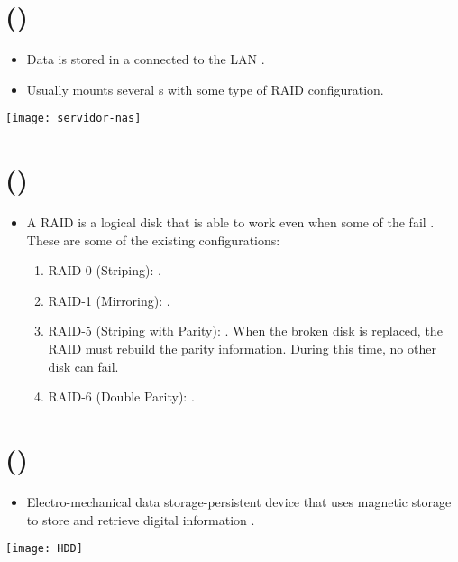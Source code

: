 \section{ ()}
\begin{itemize}
\item Data is stored in a 
  connected to the \gls{LAN} \cite{wikipedia_NAS}.
\item Usually mounts several s with some type of
  \gls{RAID} configuration.
\end{itemize}
\vspace{-4ex}
\begin{center}
  \texttt{[image: servidor-nas]}
\end{center}

\section{ ()}
\begin{itemize}
\item A \gls{RAID} is a logical disk that is able to work even when
  some of the 
  fail \cite{wikipedia_RAID}. These are some of the existing configurations:
  \begin{enumerate}
  \item RAID-0 (Striping): .
  \item RAID-1 (Mirroring): .
  \item RAID-5 (Striping with Parity): . When the broken disk is replaced, the RAID must
    rebuild the parity information. During this time, no other disk
    can fail.
  \item RAID-6 (Double Parity): .
  \end{enumerate}
\end{itemize}

\section{ ()}
\begin{itemize}
\item Electro-mechanical data storage-persistent device that uses
  magnetic storage to store and retrieve digital information
  \cite{wikipedia_NDD}.
\end{itemize}
\vspace{-4ex}
\begin{center}
  \texttt{[image: HDD]}
\end{center}

